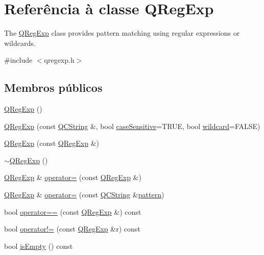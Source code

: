 \hypertarget{class_q_reg_exp}{\section{Referência à classe Q\-Reg\-Exp}
\label{class_q_reg_exp}
}


The \hyperlink{class_q_reg_exp}{Q\-Reg\-Exp} class provides pattern matching using regular expressions or wildcards.  




{\ttfamily \#include $<$qregexp.\-h$>$}

\subsection*{Membros públicos}
\begin{DoxyCompactItemize}
\item 
\hyperlink{class_q_reg_exp_accfc7c82e1b7db623714eac69afb4bfd}{Q\-Reg\-Exp} ()
\item 
\hyperlink{class_q_reg_exp_adfe2e32eb3908054243c8cdc17a874a2}{Q\-Reg\-Exp} (const \hyperlink{class_q_c_string}{Q\-C\-String} \&, bool \hyperlink{class_q_reg_exp_a8ffc24a7e547c9f11973ad94ce366080}{case\-Sensitive}=T\-R\-U\-E, bool \hyperlink{class_q_reg_exp_ad838556c640e5d5c418e8d1fb9cbf5cb}{wildcard}=F\-A\-L\-S\-E)
\item 
\hyperlink{class_q_reg_exp_af9b9b013a5504bb99f17e2d271496dfb}{Q\-Reg\-Exp} (const \hyperlink{class_q_reg_exp}{Q\-Reg\-Exp} \&)
\item 
\hyperlink{class_q_reg_exp_aec7f8fdca4bbef3530d3d78fd044090c}{$\sim$\-Q\-Reg\-Exp} ()
\item 
\hyperlink{class_q_reg_exp}{Q\-Reg\-Exp} \& \hyperlink{class_q_reg_exp_af81cccecd2612b1ac95627572ab019ec}{operator=} (const \hyperlink{class_q_reg_exp}{Q\-Reg\-Exp} \&)
\item 
\hyperlink{class_q_reg_exp}{Q\-Reg\-Exp} \& \hyperlink{class_q_reg_exp_a534333e6c045b60718bc3100ad807c89}{operator=} (const \hyperlink{class_q_c_string}{Q\-C\-String} \&\hyperlink{class_q_reg_exp_af38e77edbe06b9cb201001d58a50f49d}{pattern})
\item 
bool \hyperlink{class_q_reg_exp_a78a57f859f635432ed344c7c716a787f}{operator==} (const \hyperlink{class_q_reg_exp}{Q\-Reg\-Exp} \&) const 
\item 
bool \hyperlink{class_q_reg_exp_a8374ead8ac6a0ebdaf54e440e7d8d9ce}{operator!=} (const \hyperlink{class_q_reg_exp}{Q\-Reg\-Exp} \&r) const 
\item 
bool \hyperlink{class_q_reg_exp_a479432127ee77145cc19d6a2d1590821}{is\-Empty} () const 

\end{DoxyCompactItemize}
